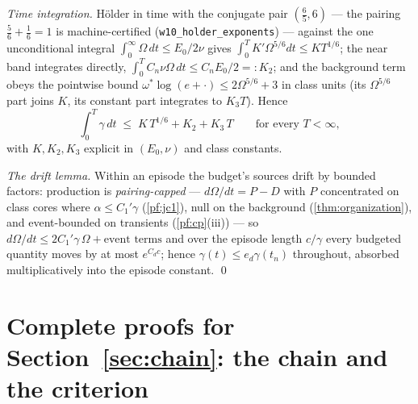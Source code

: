 \documentclass[11pt,letterpaper]{amsart}
\theoremstyle{definition}
\theoremstyle{remark}
\newcommand{\om}{\omega}
\begin{document}
\emph{Time integration.} H\"older in time with the conjugate pair
$(\tfrac65,6)$ --- the pairing $\tfrac56+\tfrac16=1$ is machine-certified
(\texttt{w10\_holder\_exponents}) --- against the one unconditional integral
$\int_0^\infty\Omega\,dt\le E_0/2\nu$ gives
$\int_0^TK'\Omega^{5/6}dt\le KT^{1/6}$; the near band integrates directly,
$\int_0^TC_n\nu\Omega\,dt\le C_nE_0/2=:K_2$; and the background term obeys the
pointwise bound $\om^*\log(e+\cdot)\le2\Omega^{5/6}+3$ in class units (its
$\Omega^{5/6}$ part joins $K$, its constant part integrates to $K_3T$). Hence
\[
\int_0^T\gamma\,dt\;\le\;K\,T^{1/6}+K_2+K_3\,T\qquad\text{for every }T<\infty,
\]
with $K,K_2,K_3$ explicit in $(E_0,\nu)$ and class constants.

\emph{The drift lemma.} Within an episode the budget's sources drift by bounded
factors: production is \emph{pairing-capped} --- $d\Omega/dt=P-D$ with $P$
concentrated on class cores where $\alpha\le C_1'\gamma$ (\cref{pf:jc1}), null on
the background (\cref{thm:organization}), and event-bounded on transients
(\cref{pf:cp}(iii)) --- so $d\Omega/dt\le2C_1'\gamma\,\Omega+\text{event terms}$ and
over the episode length $c/\gamma$ every budgeted quantity moves by at most
$e^{C_dc}$; hence $\gamma(t)\le e_d\gamma(t_n)$ throughout, absorbed
multiplicatively into the episode constant. \qed


\section{Complete proofs for Section~\ref{sec:chain}: the chain and the criterion}\label{pfsec:chain}
\end{document}

